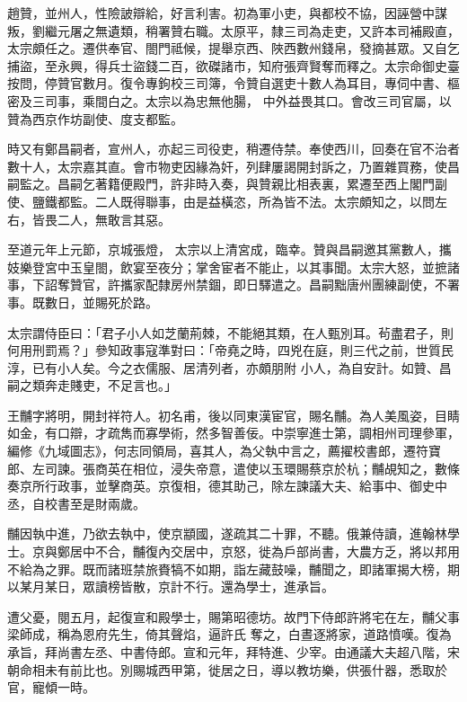 \begin{pinyinscope}
 趙贊，並州人，性險詖辯給，好言利害。初為軍小吏，與都校不協，因誣營中謀叛，劉繼元屠之無遺類，稍署贊右職。太原平，隸三司為走吏，又許本司補殿直，太宗頗任之。遷供奉官、閤門祗候，提舉京西、陜西數州錢帛，發摘甚眾。又自乞捕盜，至永興，得兵士盜錢二百，欲磔諸市，知府張齊賢奪而釋之。太宗命御史臺按問，停贊官數月。復令專鉤校三司簿，令贊自選吏十數人為耳目，專伺中書、樞密及三司事，乘間白之。太宗以為忠無他腸，
 中外益畏其口。會改三司官屬，以贊為西京作坊副使、度支都監。



 時又有鄭昌嗣者，宣州人，亦起三司役吏，稍遷侍禁。奉使西川，回奏在官不治者數十人，太宗嘉其直。會市物吏因緣為奸，列肆屢謁開封訴之，乃置雜買務，使昌嗣監之。昌嗣乞著籍便殿門，許非時入奏，與贊親比相表裏，累遷至西上閣門副使、鹽鐵都監。二人既得聯事，由是益橫恣，所為皆不法。太宗頗知之，以問左右，皆畏二人，無敢言其惡。



 至道元年上元節，京城張燈，
 太宗以上清宮成，臨幸。贊與昌嗣邀其黨數人，攜妓樂登宮中玉皇閤，飲宴至夜分；掌舍宦者不能止，以其事聞。太宗大怒，並摭諸事，下詔奪贊官，許攜家配隸房州禁錮，即日驛遣之。昌嗣黜唐州團練副使，不署事。既數日，並賜死於路。



 太宗謂侍臣曰：「君子小人如芝蘭荊棘，不能絕其類，在人甄別耳。茍盡君子，則何用刑罰焉？」參知政事寇準對曰：「帝堯之時，四兇在庭，則三代之前，世質民淳，已有小人矣。今之衣儒服、居清列者，亦頗朋附
 小人，為自安計。如贊、昌嗣之類奔走賤吏，不足言也。」



 王黼字將明，開封祥符人。初名甫，後以同東漢宦官，賜名黼。為人美風姿，目睛如金，有口辯，才疏雋而寡學術，然多智善佞。中崇寧進士第，調相州司理參軍，編修《九域圖志》，何志同領局，喜其人，為父執中言之，薦擢校書郎，遷符寶郎、左司諫。張商英在相位，浸失帝意，遣使以玉環賜蔡京於杭；黼覘知之，數條奏京所行政事，並擊商英。京復相，德其助己，除左諫議大夫、給事中、御史中
 丞，自校書至是財兩歲。



 黼因執中進，乃欲去執中，使京顓國，遂疏其二十罪，不聽。俄兼侍讀，進翰林學士。京與鄭居中不合，黼復內交居中，京怒，徙為戶部尚書，大農方乏，將以邦用不給為之罪。既而諸班禁旅賚犒不如期，詣左藏鼓噪，黼聞之，即諸軍揭大榜，期以某月某日，眾讀榜皆散，京計不行。還為學士，進承旨。



 遭父憂，閱五月，起復宣和殿學士，賜第昭德坊。故門下侍郎許將宅在左，黼父事梁師成，稱為恩府先生，倚其聲焰，逼許氏
 奪之，白晝逐將家，道路憤嘆。復為承旨，拜尚書左丞、中書侍郎。宣和元年，拜特進、少宰。由通議大夫超八階，宋朝命相未有前比也。別賜城西甲第，徙居之日，導以教坊樂，供張什器，悉取於官，寵傾一時。




\end{pinyinscope}
